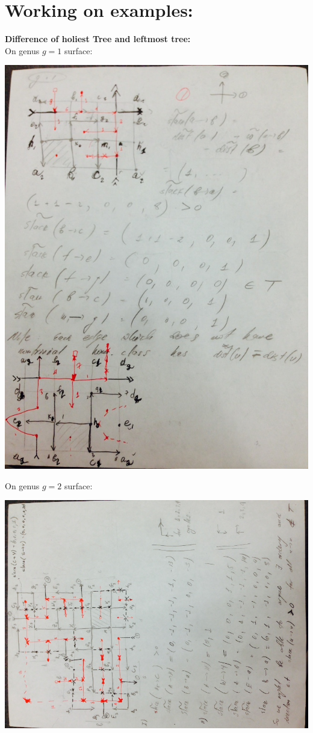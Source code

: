 \documentclass{article}
\begin{document}
\newpage
\section{Working on examples:}
\textbf{Difference of holiest Tree and leftmost tree:} \\
On genus $g = 1$ surface:
\begin{center}
\includegraphics[scale = 0.6]{genus1.jpg}
\end{center}




\newpage
On genus $g = 2$ surface:
\begin{center}
\includegraphics[angle = -90, scale = 0.7]{genus2.jpg}
\end{center}
\end{document}
